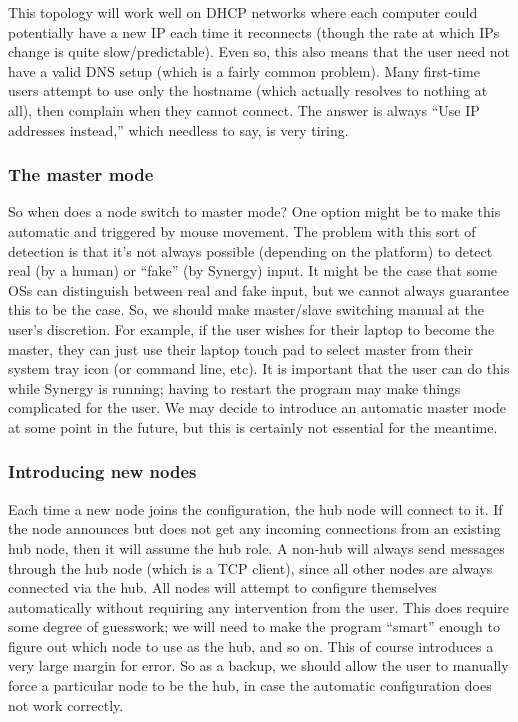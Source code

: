 This topology will work well on DHCP networks where
each computer could potentially have a new IP each time it reconnects (though
the rate at which IPs change is quite slow/predictable). Even so, this also 
means that the user need not have a valid DNS setup (which is a fairly common
problem). Many first-time users attempt to use only the hostname (which actually
resolves to nothing at all), then complain when they cannot connect. The answer
is always ``Use IP addresses instead,'' which needless to say, is very tiring.

\subsubsection{The master mode}

So when does a node switch to master mode? One option might be to make this
automatic and triggered by mouse movement. The problem with this sort of
detection is that it's not always possible (depending on the platform) to
detect real (by a human) or ``fake'' (by Synergy) input. It might be the
case that some OSs can distinguish between real and fake input, but we cannot
always guarantee this to be the case. So, we should make master/slave switching
manual at the user's discretion. For example, if the user wishes for their
laptop to become the master, they can just use their laptop touch pad to
select master from their system tray icon (or command line, etc). It is
important that the user can do this while Synergy is running; having to restart
the program may make things complicated for the user. We may decide to 
introduce an automatic master mode at some point in the future, but this is
certainly not essential for the meantime.

\subsubsection{Introducing new nodes}

Each time a new node joins the configuration, the hub node will connect to 
it. If the node announces but does not get any incoming connections from an
existing hub node, then it will assume the hub role. A non-hub will always send
messages through the hub node (which is a TCP client), since all other nodes 
are always connected via the hub. All nodes will attempt to configure 
themselves automatically without requiring any intervention from the user. This
does require some degree of guesswork; we will need to make the program 
``smart'' enough to figure out which node to use as the hub, and so on. This of
course introduces a very large margin for error. So as a backup, we should 
allow the user to manually force a particular node to be the hub, in case the
automatic configuration does not work correctly.

